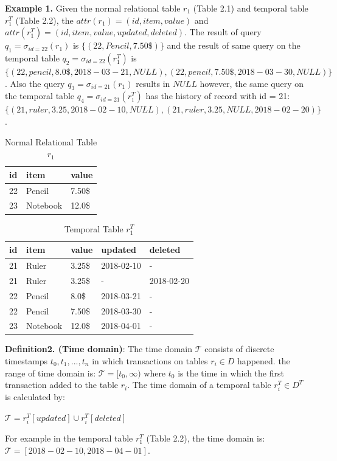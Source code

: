 \textbf{Example 1.} Given the normal relational table $r_1$ (Table 2.1) and temporal table $r_1^T$ (Table 2.2), the $attr(r_1) = (id, item, value)$ and $attr(r_1^T) = (id, item, value, updated, deleted)$. The result of query $q_1 = \sigma_{id = 22}(r_1)$ is $\{(22,Pencil,7.50\$)\}$ and the result of same query on the temporal table $q_2 = \sigma_{id = 22}(r_1^T)$ is $\{(22,pencil,8.0\$,2018-03-21,NULL),(22,pencil,7.50\$,2018-03-30,NULL)\}$. Also the query $q_3 = \sigma_{id = 21}(r_1)$ results in $NULL$ however, the same query on the temporal table $q_4 = \sigma_{id = 21}(r_1^T)$ has the history of record with id = 21: $\{(21,ruler,3.25,2018-02-10,NULL),(21,ruler,3.25,NULL,2018-02-20)\}$.
\begin{center}

\begin{table}[t]
	\centering
	\caption{Normal Relational Table $r_1$}
	\begin{tabular}{p{4cm}p{4cm}p{4cm}}
		\hline
		id & item      & value  \\ \hline
		22 & Pencil    & 7.50\$ \\
		23 & Notebook & 12.0\$   \\ \hline
	\end{tabular}
\end{table}

\begin{table}[t]
	\centering
	\caption{Temporal Table $r_1^T$}
	\begin{tabular}{p{1cm}p{2cm}p{3cm}p{3cm}p{2cm}}
		\hline
		id & item      & value  & updated  & deleted\\ \hline
		21 & Ruler    & 3.25\$  & 2018-02-10  &  - \\  
		21 & Ruler    & 3.25\$  & -  &  2018-02-20 \\
		22 & Pencil    & 8.0\$  & 2018-03-21  &  - \\
		22 & Pencil    & 7.50\$  & 2018-03-30  &  -\\
		23 & Notebook & 12.0\$  & 2018-04-01 & - \\ \hline
	\end{tabular}
\end{table} 
\end{center}


\textbf{Definition2. (Time domain)}: 
The time domain $\mathcal{T}$ consists of discrete timestamps $t_0,t_1,...,t_n$ in which transactions on tables $r_i \in D$ happened. the range of time domain is: $\mathcal{T} = [t_0, \infty)$ where $t_0$ is the time in which the first transaction added to the table $r_i$.
The time domain of a temporal table $r_i^T \in D^T $ is calculated by:\\
\begin{center}
	$\mathcal{T} = r_i^T[updated] \cup r_i^T[deleted]$
\end{center}
For example in the temporal table $r_1^T$ (Table 2.2), the time domain is:
$\mathcal{T} = [2018-02-10,2018-04-01]$.\\

